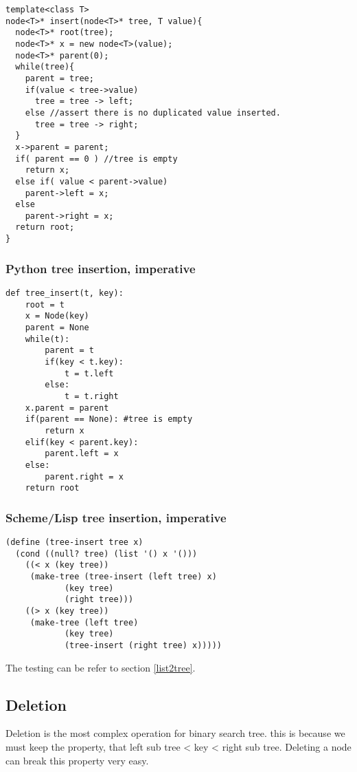 \documentclass{article}
\begin{document}
\lstset{language=C++}
\begin{lstlisting}
template<class T>
node<T>* insert(node<T>* tree, T value){
  node<T>* root(tree);
  node<T>* x = new node<T>(value);
  node<T>* parent(0);
  while(tree){
    parent = tree;
    if(value < tree->value)
      tree = tree -> left;
    else //assert there is no duplicated value inserted.
      tree = tree -> right;
  }
  x->parent = parent;
  if( parent == 0 ) //tree is empty
    return x;
  else if( value < parent->value)
    parent->left = x;
  else
    parent->right = x;
  return root;
}
\end{lstlisting}

\subsubsection*{Python tree insertion, imperative}

\lstset{language=Python}
\begin{lstlisting}
def tree_insert(t, key):
    root = t
    x = Node(key)
    parent = None
    while(t):
        parent = t
        if(key < t.key):
            t = t.left
        else:
            t = t.right
    x.parent = parent
    if(parent == None): #tree is empty
        return x
    elif(key < parent.key):
        parent.left = x
    else:
        parent.right = x
    return root
\end{lstlisting}

\subsubsection*{Scheme/Lisp tree insertion, imperative}

\lstset{language=lisp}
\begin{lstlisting}
(define (tree-insert tree x)
  (cond ((null? tree) (list '() x '()))
	((< x (key tree))
	 (make-tree (tree-insert (left tree) x)
		    (key tree)
		    (right tree)))
	((> x (key tree))
	 (make-tree (left tree)
		    (key tree)
		    (tree-insert (right tree) x)))))
\end{lstlisting}

The testing can be refer to section \ref{list2tree}.

\subsection{Deletion}
Deletion is the most complex operation for binary search tree. this is because we
must keep the property, that left sub tree < key < right sub tree. Deleting a node
can break this property very easy.
\end{document}
